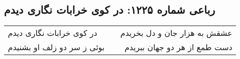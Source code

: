 \begin{center}
\section*{رباعی شماره ۱۲۲۵: در کوی خرابات نگاری دیدم}
\label{sec:1225}
\begin{longtable}{l p{0.5cm} r}
در کوی خرابات نگاری دیدم
&&
عشقش به هزار جان و دل بخریدم
\\
بوئی ز سر دو زلف او بشنیدم
&&
دست طمع از هر دو جهان ببریدم
\\
\end{longtable}
\end{center}
